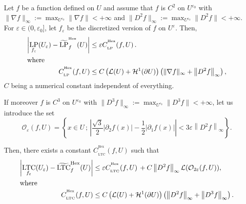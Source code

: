 \documentclass[AHL,Unicode,longabstracts,published]{cedram}
\newcommand{\eps}{\varepsilon}
\DeclareMathOperator{\LTC}{LTC}
\DeclareMathOperator{\LP}{LP}
\DeclareMathOperator{\Hex}{Hex}
\newcommand{\tLP}{\widetilde{\mathrm{LP}}}
\newcommand{\tLTC}{\widetilde{\mathrm{LTC}}}
\newcommand{\calH}{\mathcal{H}}
\newcommand{\calL}{\mathcal{L}}
\newcommand{\calO}{\mathcal{O}}
\begin{document}
\begin{theo}\label{limit-deter:th}
Let $f$ be a function defined on $U$ and assume that $f$ is $C^2$ on $U^{\eps_0}$ with $\|\nabla f\|_\infty:=\max_{U^{\eps_0}}\|\nabla f\|<+\infty$ and $ \|D^2 f\|_\infty:=\max_{U^{\eps_0}}\|D^2 f\|<+\infty$. For $\eps\in (0,\eps_0]$, let $f_\eps$ be the discretized version of $f$ on $U^{\eps}$. Then,
\begin{align*}
\left| \LP_{f_\eps}(U_\eps) - \tLP^{^{\Hex}}_{f}(U) \right| &\leq
\eps C_{_{\LP}}^{^{\Hex}}(f,U) \,.
\\
\intertext{where}
C_{_{\LP}}^{^{\Hex}}(f,U)&\le C \left({\calL}(U)+{\calH}^1(\partial U)\right)\left(\|\nabla f\|_\infty+\left\|D^2
f\right\|_\infty\right),
\end{align*}
$C$ being a numerical constant independent of everything.

If moreover $f$ is $C^3$ on $U^{\eps_0}$ with $\|D^3 f\|_\infty:=\max_{U^{\eps_0}}\|D^3 f\|<+\infty$, let us introduce the set
\[
{\calO}_{\eps}(f,U) =\left\{ x\in U \, ; \, \left|
\frac{\sqrt{3}}{2}\left|\partial_2f(x)\right|-\frac{1}{2}\left|\partial_1 f(x)\right| \right|<
3 \eps \left\|D^2 f\right\|_\infty \right\}.
\]

Then, there exists a constant $C_{_{\LTC}}^{^{\Hex}}(f,U)$ such that
\begin{align*}
\left|\LTC_{f_\eps}(U_\eps)-\tLTC_{f}^{\Hex}(U)\right| &\le
\eps C_{_{\LTC}}^{^{\Hex}}(f,U)\, + C \left\|D^2 f\right\|_\infty {\calL}({\mathcal
O}_{2\eps}(f,U)),
\\
\intertext{where}
C_{_{\LTC}}^{^{\Hex}}(f,U) &\le C\left({\calL}(U)+{\calH}^1(\partial U)\right)\left(\left\|D^2f\right\|_\infty+\left\|D^3f\right\|_\infty\right).
\end{align*}
\end{theo}
\end{document}
